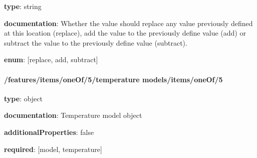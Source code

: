 \begin{itemized}
\item {\bf type}: string
\item {\bf documentation}: Whether the value should replace any value previously defined at this location (replace), add the value to the previously define value (add) or subtract the value to the previously define value (subtract).
\item {\bf enum}: [replace, add, subtract]\end{itemized}\paragraph{/features/items/oneOf/5/temperature models/items/oneOf/5} \begin{itemized}
\item {\bf type}: object
\item {\bf documentation}: Temperature model object
\item {\bf additionalProperties}: false
\item {\bf required}: [model, temperature]\end{itemized}
